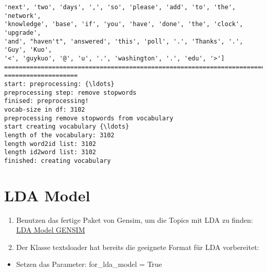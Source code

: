 \documentclass[11pt]{article}
\providecommand{\tightlist}{%
      \setlength{\itemsep}{0pt}\setlength{\parskip}{0pt}}
\begin{document}
\begin{Verbatim}[commandchars=\\\{\}]
'next', 'two', 'days', ',', 'so', 'please', 'add', 'to', 'the', 'network',
'knowledge', 'base', 'if', 'you', 'have', 'done', 'the', 'clock', 'upgrade',
'and', "haven't", 'answered', 'this', 'poll', '.', 'Thanks', '.', 'Guy', 'Kuo',
'<', 'guykuo', '@', 'u', '.', 'washington', '.', 'edu', '>']
================================================================================
====================
start: preprocessing: {\ldots}
preprocessing step: remove stopwords
finised: preprocessing!
vocab-size in df: 3102
preprocessing remove stopwords from vocabulary
start creating vocabulary {\ldots}
length of the vocabulary: 3102
length word2id list: 3102
length id2word list: 3102
finished: creating vocabulary
\end{Verbatim}

    \hypertarget{lda-model}{%
\section{\texorpdfstring{\textbf{LDA
Model}}{LDA Model}}\label{lda-model}}

\begin{enumerate}
\def\labelenumi{\arabic{enumi}.}
\tightlist
\item
  Benutzen das fertige Paket von Gensim, um die Topics mit LDA zu
  finden:
  \href{https://radimrehurek.com/gensim/models/ldamodel.html}{LDA Model
  GENSIM}
\item
  Der Klasse textsloader hat bereits die geeignete Format für LDA
  vorbereitet:
\end{enumerate}

\begin{itemize}
\tightlist
\item
  Setzen das Parameter: for\_lda\_model = True
\end{itemize}
\end{document}

